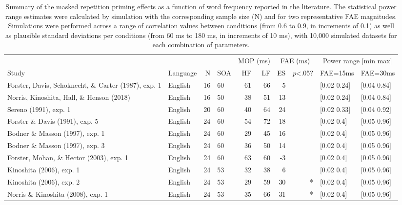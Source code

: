 \documentclass[
]{interact}
\begin{document}
\begin{longtable}{l|lrlrrrrll}

\caption{\label{tbl-litReview}Summary of the masked repetition priming
effects as a function of word frequency reported in the literature. The
statistical power range estimates were calculated by simulation with the
corresponding sample size (N) and for two representative FAE magnitudes.
Simulations were performed across a range of correlation values between
conditions (from 0.6 to 0.9, in increments of 0.1) as well as plausible
standard deviations per conditions (from 60 ms to 180 ms, in increments
of 10 ms), with 10,000 simulated datasets for each combination of
parameters.}

\tabularnewline

\toprule
\multicolumn{1}{l}{} &  &  &  & \multicolumn{2}{c}{MOP (ms)} & \multicolumn{2}{c}{FAE (ms)} & \multicolumn{2}{c}{Power range [min max]} \\ 
\cmidrule(lr){5-6} \cmidrule(lr){7-8} \cmidrule(lr){9-10}
\multicolumn{1}{l}{Study} & Language & N & SOA & HF & LF & ES & \emph{p}\textless{}.05? & FAE=15ms & FAE=30ms \\ 
\midrule\addlinespace[2.5pt]
Forster, Davis, Schoknecht, \& Carter (1987), exp. 1 & English & 16 & 60 & 61 & 66 & 5 &   & [0.02 0.24] & [0.04 0.84] \\ 
Norris, Kinoshita, Hall, \& Henson (2018) & English & 16 & 50 & 38 & 51 & 13 &   & [0.02 0.24] & [0.04 0.84] \\ 
Sereno (1991), exp. 1 & English & 20 & 60 & 40 & 64 & 24 &   & [0.02 0.33] & [0.04 0.92] \\ 
Forster \& Davis (1991), exp. 5 & English & 24 & 60 & 54 & 72 & 18 &   & [0.02 0.4] & [0.05 0.96] \\ 
Bodner \& Masson (1997), exp. 1 & English & 24 & 60 & 29 & 45 & 16 &   & [0.02 0.4] & [0.05 0.96] \\ 
Bodner \& Masson (1997), exp. 3 & English & 24 & 60 & 36 & 50 & 14 &   & [0.02 0.4] & [0.05 0.96] \\ 
Forster, Mohan, \& Hector (2003), exp. 1 & English & 24 & 60 & 63 & 60 & -3 &   & [0.02 0.4] & [0.05 0.96] \\ 
Kinoshita (2006), exp. 1 & English & 24 & 53 & 32 & 38 & 6 &   & [0.02 0.4] & [0.05 0.96] \\ 
Kinoshita (2006), exp. 2 & English & 24 & 53 & 29 & 59 & 30 & * & [0.02 0.4] & [0.05 0.96] \\ 
Norris \& Kinoshita (2008), exp. 1 & English & 24 & 53 & 35 & 66 & 31 & * & [0.02 0.4] & [0.05 0.96] \\ 

\end{longtable}
\end{document}
